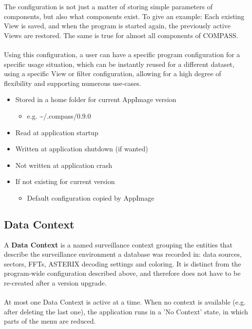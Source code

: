 The configuration is not just a matter of storing simple parameters of components, but also what components exist. To give an example: Each existing View is saved, and when the program is started again, the previously active Views are restored. The same is true for almost all components of COMPASS. \\\\

Using this configuration, a user can have a specific program configuration for a specific usage situation, which can be instantly reused for a different dataset, using a specific View or filter configuration, allowing for a high degree of flexibility and supporting numerous use-cases. \\


\begin{itemize}
\item Stored in a home folder for current AppImage version
\begin{itemize}
\item e.g. \textasciitilde/.compass/0.9.0
\end{itemize}
\item Read at application startup
\item Written at application shutdown (if wanted)
\item Not written at application crash
\item If not existing for current version
\begin{itemize}
\item Default configuration copied by AppImage
\end{itemize}
\end{itemize}

\subsection*{Data Context}
A \textbf{Data Context} is a named surveillance context grouping the entities that describe the surveillance environment a database was recorded in: data sources, sectors, FFTs, ASTERIX decoding settings and coloring. It is distinct from the program-wide configuration described above, and 
therefore does not have to be re-created after a version upgrade. \\\\

At most one Data Context is active at a time. When no context is available (e.g. after deleting the last one), the application runs in a 'No Context' state, in which parts of the menu are reduced. \\

